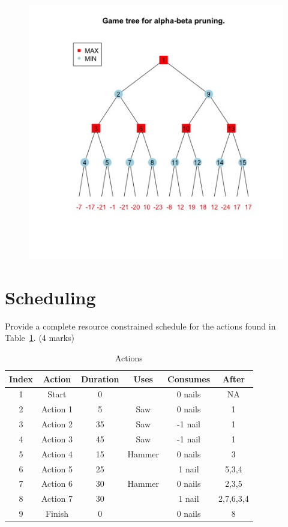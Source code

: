 \documentclass{article}
\begin{document}
\begin{figure}[h!]
\includegraphics[width=\textwidth]{ab.jpg}
\end{figure}
\clearpage
\section{Scheduling}

Provide a complete resource constrained schedule for the actions found in Table~\ref{schActions}. (4 marks)
\begin{table}[h!]
\caption{Actions}
\label{schActions}
\begin{center}
\begin{tabular}{ |c|c|c|c|c|c| } 
\hline
 Index & Action & Duration & Uses & Consumes & After \\
\hline
1 & Start & 0 &   & 0 nails & NA\\
2 & Action 1 & 5 &  Saw & 0 nails & 1\\
3 & Action 2 & 35 &  Saw & -1 nail & 1\\
4 & Action 3 & 45 &  Saw & -1 nail & 1\\
5 & Action 4 & 15 &  Hammer & 0 nails & 3\\
6 & Action 5 & 25 &   & 1 nail & 5,3,4\\
7 & Action 6 & 30 &  Hammer & 0 nails & 2,3,5\\
8 & Action 7 & 30 &   & 1 nail & 2,7,6,3,4\\
9 & Finish & 0 &   & 0 nails & 8\\
\hline
\end{tabular}
\end{center}
\end{table}
\clearpage
\end{document}
